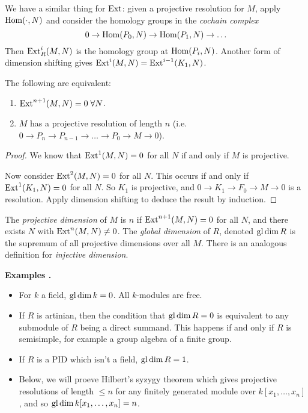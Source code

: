 \documentclass[10pt,a4paper]{article}
\begin{document}
We have a similar thing for $\operatorname{Ext}$: given a projective resolution for $M$, apply $\operatorname{Hom}(\cdot, N)$ and consider the homology groups in the \emph{cochain complex}
\[0 \to \operatorname{Hom}(P_0, N) \to \operatorname{Hom}(P_1, N) \to \ldots\]
Then $\operatorname{Ext}_R^i(M,N)$ is the homology group at $\operatorname{Hom}(P_i, N)$. Another form of dimension shifting gives $\operatorname{Ext}^i(M,N) = \operatorname{Ext}^{i-1}(K_1,N)$.
\begin{lemma}
  The following are equivalent:
  \begin{enumerate}
    \item $\Ext^{n+1}(M,N) = 0 \forall N$.
    \item $M$ has a projective resolution of length $n$ (i.e. $0 \to P_n \to P_{n-1} \to \ldots \to P_0 \to M \to 0$).
  \end{enumerate}
\end{lemma}
\begin{proof}
  We know that $\operatorname{Ext}^1(M,N) = 0$ for all $N$ if and only if $M$ is projective.

  Now consider $\operatorname{Ext}^2(M,N) = 0$ for all $N$. This occurs if and only if $\operatorname{Ext}^1(K_1, N) = 0$ for all $N$. So $K_1$ is projective, and $0 \to K_1 \to F_0 \to M\to 0$ is a resolution. Apply dimension shifting to deduce the result by induction.
\end{proof}
\begin{definition}
  The \emph{projective dimension} of $M$ is $n$ if $\operatorname{Ext}^{n+1}(M,N) = 0$ for all $N$, and there exists $N$ with $\operatorname{Ext}^n(M,N) \neq 0$. The \emph{global dimension} of $R$, denoted $\operatorname{gl} \dim R$ is the supremum of all projective dimensions over all $M$. There is an analogous definition for \emph{injective dimension}.
\end{definition}
\textbf{Examples \thetheorem.}
\begin{itemize}
  \item For $k$ a field, $\operatorname{gl} \dim k = 0$. All $k$-modules are free.
  \item If $R$ is artinian, then the condition that $\operatorname{gl} \dim R = 0$ is equivalent to any submodule of $R$ being a direct summand. This happens if and only if $R$ is semisimple, for example a group algebra of a finite group.
  \item If $R$ is a PID which isn't a field, $\operatorname{gl} \dim R = 1$.
  \item Below, we will proeve Hilbert's syzygy theorem which gives projective resolutions of length $\leq n$ for any finitely generated module over $k[x_1, \ldots, x_n]$, and so $\operatorname{gl}\dim k[x_1, \ldots, x_n] = n$.
\end{itemize}
\end{document}
